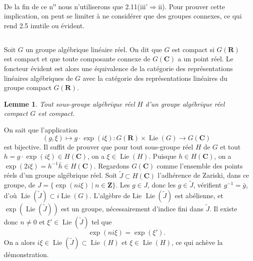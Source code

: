 \documentclass[11pt]{amsart}
\theoremstyle{plain}
\newtheorem{lemme}[theoreme]{Lemme}
\theoremstyle{definition}
\theoremstyle{remark}
\begin{document}
De la fin de ce n\textsuperscript{o} nous n'utiliserons que 2.11(iii'$\Rightarrow$ii). Pour prouver cette implication, on peut se limiter \`a ne consid\'erer que des groupes connexes, ce qui rend 2.5 inutile ou \'evident.

\subsection*{}
Soit $G$ un groupe alg\'ebrique lin\'eaire r\'eel. On dit que $G$ est compact si $G(\mathbf{R})$ est compact et que toute composante connexe de $G(\mathbf{C})$ a un point r\'eel. Le foncteur \'evident est alors une \'equivalence de la cat\'egorie des repr\'esentations lin\'eaires alg\'ebriques de $G$ avec la cat\'egorie des repr\'esentations lin\'eaires du groupe compact $G(\mathbf{R})$.

\begin{lemme}
Tout sous-groupe alg\'ebrique r\'eel $H$ d'un groupe alg\'ebrique r\'eel compact $G$ est compact.
\end{lemme}

On sait que l'application
\begin{equation*}
(g,\xi)\mapsto g\cdot\exp(i\xi)\colon G(\mathbf{R})\times\operatorname{Lie}(G)\to G(\mathbf{C})
\end{equation*}
est bijective. Il suffit de prouver que pour tout sous-groupe r\'eel $H$ de $G$ et tout $h=g\cdot\exp(i\xi)\in H(\mathbf{C})$, on a $\xi\in\operatorname{Lie}(H)$. Puisque $h\in H(\mathbf{C})$, on a $\exp(2i\xi)=h^{-1}\bar{h}\in H(\mathbf{C})$. Regardons $G(\mathbf{C})$ comme l'ensemble des points r\'eels d'un groupe alg\'ebrique r\'eel. Soit $\tilde{J}\subset H(\mathbf{C})$ l'adh\'erence de Zariski, dans ce groupe, de $J=\{\exp(ni\xi)\mid n\in\mathbf{Z}\}$. Les $g\in J$, donc les $g\in\tilde{J}$, v\'erifient $g^{-1}=\bar{g}$, d'o\`u $\operatorname{Lie}(\tilde{J})\subset i\operatorname{Lie}(G)$. L'alg\`ebre de Lie $\operatorname{Lie}(\tilde{J})$ est ab\'elienne, et $\exp(\operatorname{Lie}(\tilde{J}))$ est un groupe, n\'ecessairement d'indice fini dans $\tilde{J}$. Il existe donc $n\neq 0$ et $\xi'\in\operatorname{Lie}(\tilde{J})$ tel que
\begin{equation*}
\exp(ni\xi)=\exp(\xi').
\end{equation*}
On a alors $i\xi\in\operatorname{Lie}(\tilde{J})\subset\operatorname{Lie}(H)$ et $\xi\in\operatorname{Lie}(H)$, ce qui ach\`eve la d\'emonstration.
\end{document}

